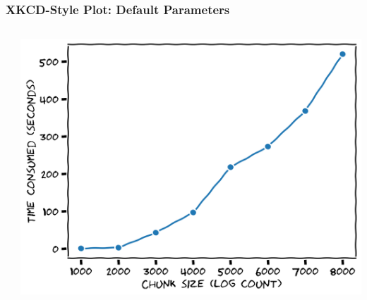 \documentclass[xcolor={svgnames}]{beamer}
\newcommand{\pyfile}[2][]{}
\begin{document}
\begin{frame}[t,fragile]
    \frametitle{XKCD-Style Plot: Default Parameters}
    \vspace{-2mm}
    \begin{columns}[T]
        \begin{column}{0.49\textwidth}
            \pyfile[style=footnotesize]{examples/xkcd-2.py}
        \end{column}
        \begin{column}{0.51\textwidth}
            \includegraphics[width=\textwidth]{img/xkcd-1.png}
        \end{column}
    \end{columns}
\end{frame}
\end{document}
